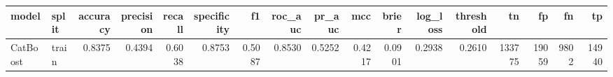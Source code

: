 \begin{tabular}{llrrrrrrrrrrrrrrr}
\toprule
model & split & accuracy & precision & recall & specificity & f1 & roc\_auc & pr\_auc & mcc & brier & log\_loss & threshold & tn & fp & fn & tp \\
\midrule
CatBoost & train & 0.8375 & 0.4394 & 0.6038 & 0.8753 & 0.5087 & 0.8530 & 0.5252 & 0.4217 & 0.0901 & 0.2938 & 0.2610 & 133775 & 19059 & 9802 & 14940 \\
\bottomrule
\end{tabular}
